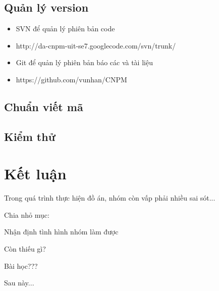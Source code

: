\documentclass{article}
\begin{document}
			\subsection{Quản lý version}
			
				\begin{itemize}
					\item SVN để quản lý phiên bản code
					\item http://da-cnpm-uit-se7.googlecode.com/svn/trunk/
					\item Git để quản lý phiên bản báo các và tài liệu
					\item https://github.com/vunhan/CNPM
				\end{itemize}
			
			\subsection{Chuẩn viết mã}
			\subsection{Kiểm thử}
			
	\newpage			
	\section{Kết luận}
	
	Trong quá trình thực hiện đồ án, nhóm còn vấp phải nhiều sai sót...
	
	
	Chia nhỏ mục:
	
	Nhận định tình hình nhóm làm được
	
	Còn thiếu gì?
	
	Bài học???
	
	Sau này...
	
\end{document}

